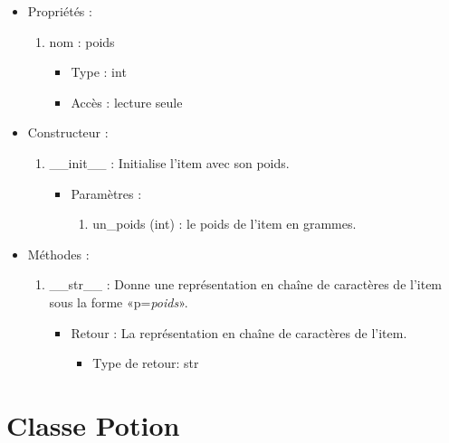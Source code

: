 \documentclass[12pt,pdftex,oneside]{article}
\begin{document}
  \begin{itemize}
  \item Propriétés : 
    \begin{enumerate}
    \item nom : poids
          \begin{itemize}
          \item Type : int
          \item Accès : lecture seule
          \end{itemize}

    \end{enumerate}

  \item Constructeur : 

  \begin{enumerate}
  \item \_\_init\_\_ : Initialise l'item avec son poids.
    \begin{itemize}
    \item Paramètres : 
      \begin{enumerate}
      \item un\_poids (int) : le poids de l'item en grammes.
      \end{enumerate}
    \end{itemize}

  \end{enumerate}

  \item Méthodes : 

    \begin{enumerate}
    \item \_\_str\_\_ : Donne une représentation en chaîne de caractères de l'item sous la forme «p=\emph{poids}».
      \begin{itemize}
      \item Retour : La représentation en chaîne de caractères de l'item.
          \begin{itemize}
          \item Type de retour: str
          \end{itemize}
      \end{itemize}

    \end{enumerate}
  \end{itemize}
  \section {Classe Potion}
\end{document}
